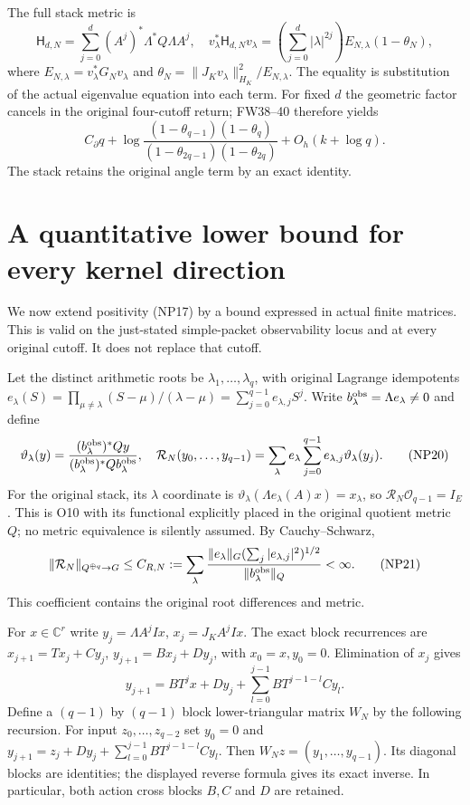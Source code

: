 \documentclass[11pt]{article}
\newcommand{\C}{\mathbb C}
\begin{document}
The full stack metric is
\[
 \mathsf H_{d,N}=\sum_{j=0}^d(A^j)^*\Lambda^*Q\Lambda A^j,
 \quad v_\lambda^*\mathsf H_{d,N}v_\lambda
  =\left(\sum_{j=0}^d|\lambda|^{2j}\right)E_{N,\lambda}(1-\theta_N),
 \tag{NP18}
\]
where $E_{N,\lambda}=v_\lambda^*G_Nv_\lambda$ and
$\theta_N=\|J_Kv_\lambda\|_{H_K}^2/E_{N,\lambda}$.
The equality is substitution of the actual eigenvalue equation into
each term. For fixed $d$ the geometric factor cancels in the original
four-cutoff return; FW38--40 \cite{FW} therefore yields
\[
 C_\partial q+
 \log\frac{(1-\theta_{q-1})(1-\theta_q)}
               {(1-\theta_{2q-1})(1-\theta_{2q})}
       +O_h(k+\log q). \tag{NP19}
\]
The stack retains the original angle term by an exact identity.

\section{A quantitative lower bound for every kernel direction}
We now extend positivity (NP17) by a bound expressed in actual finite
matrices. This is valid on the just-stated simple-packet observability
locus and at every original cutoff. It does not replace that cutoff.

Let the distinct arithmetic roots be $\lambda_1,\ldots,\lambda_q$,
with original Lagrange idempotents
$e_\lambda(S)=\prod_{\mu\ne\lambda}(S-\mu)/(\lambda-\mu)
=\sum_{j=0}^{q-1}e_{\lambda,j}S^j$. Write
$b_\lambda^{\rm obs}=\Lambda e_\lambda\ne0$ and define
\[
 \vartheta_\lambda(y)=
 \frac{(b_\lambda^{\rm obs})^*Qy}{
             (b_\lambda^{\rm obs})^*Qb_\lambda^{\rm obs}},
 \quad\mathcal R_N(y_0,\ldots,y_{q-1})
 =\sum_\lambda e_\lambda\sum_{j=0}^{q-1}e_{\lambda,j}
                                      \vartheta_\lambda(y_j).
 \tag{NP20}
\]
For the original stack, its $\lambda$ coordinate is
$\vartheta_\lambda(\Lambda e_\lambda(A)x)=x_\lambda$, so
$\mathcal R_N\mathcal O_{q-1}=I_E$. This is O10 with its
functional explicitly placed in the original quotient metric $Q$;
no metric equivalence is silently assumed. By Cauchy--Schwarz,
\[
 \|\mathcal R_N\|_{Q^{\oplus q}\to G}\le C_{R,N}:=
 \sum_\lambda\frac{\|e_\lambda\|_G
                 (\sum_j|e_{\lambda,j}|^2)^{1/2}}
                        {\|b_\lambda^{\rm obs}\|_Q}<\infty.
 \tag{NP21}
\]
This coefficient contains the original root differences and metric.

For $x\in\C^r$ write
$y_j=\Lambda A^jIx$, $x_j=J_KA^jIx$. The exact block recurrences
are $x_{j+1}=Tx_j+Cy_j$, $y_{j+1}=Bx_j+Dy_j$,
with $x_0=x,y_0=0$. Elimination of $x_j$ gives
\[
 y_{j+1}=BT^jx+Dy_j+
                 \sum_{l=0}^{j-1}BT^{j-1-l}Cy_l.
 \tag{NP22}
\]
Define a $(q-1)$ by $(q-1)$ block lower-triangular matrix $W_N$ by
the following recursion. For input $z_0,\ldots,z_{q-2}$ set $y_0=0$
and $y_{j+1}=z_j+Dy_j+\sum_{l=0}^{j-1}BT^{j-1-l}Cy_l$.
Then $W_Nz=(y_1,\ldots,y_{q-1})$. Its diagonal blocks are identities;
the displayed reverse formula gives its exact inverse. In particular,
both action cross blocks $B,C$ and $D$ are retained.
\end{document}
